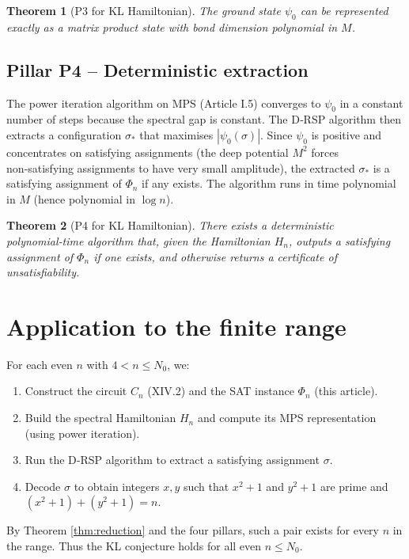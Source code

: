 \documentclass[11pt,a4paper]{article}
\newtheorem{theorem}{Theorem}[section]
\begin{document}
\begin{theorem}[P3 for KL Hamiltonian]
The ground state \(\psi_0\) can be represented exactly as a matrix product state with bond dimension polynomial in \(M\).
\end{theorem}

\subsection{Pillar P4 – Deterministic extraction}

The power iteration algorithm on MPS (Article I.5) converges to \(\psi_0\) in a constant number of steps because the spectral gap is constant. The D‑RSP algorithm then extracts a configuration \(\sigma_{*}\) that maximises \(|\psi_0(\sigma)|\). Since \(\psi_0\) is positive and concentrates on satisfying assignments (the deep potential \(M^2\) forces non‑satisfying assignments to have very small amplitude), the extracted \(\sigma_{*}\) is a satisfying assignment of \(\Phi_n\) if any exists. The algorithm runs in time polynomial in \(M\) (hence polynomial in \(\log n\)).

\begin{theorem}[P4 for KL Hamiltonian]
There exists a deterministic polynomial‑time algorithm that, given the Hamiltonian \(H_n\), outputs a satisfying assignment of \(\Phi_n\) if one exists, and otherwise returns a certificate of unsatisfiability.
\end{theorem}

\section{Application to the finite range}

For each even \(n\) with \(4 < n \le N_0\), we:
\begin{enumerate}
\item Construct the circuit \(C_n\) (XIV.2) and the SAT instance \(\Phi_n\) (this article).
\item Build the spectral Hamiltonian \(H_n\) and compute its MPS representation (using power iteration).
\item Run the D‑RSP algorithm to extract a satisfying assignment \(\sigma\).
\item Decode \(\sigma\) to obtain integers \(x,y\) such that \(x^2+1\) and \(y^2+1\) are prime and \((x^2+1)+(y^2+1)=n\).
\end{enumerate}
By Theorem \ref{thm:reduction} and the four pillars, such a pair exists for every \(n\) in the range. Thus the KL conjecture holds for all even \(n \le N_0\).
\end{document}
